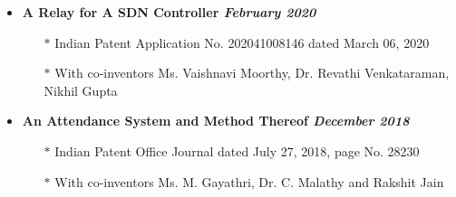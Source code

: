 \documentclass[10]{Resume}
\begin{document}
\begin{itemize}[noitemsep,nolistsep]
	\item\textbf{A Relay for A SDN Controller \hfill \textit{February 2020}}
		\begin{itemize}[leftmargin=*]
			\setlength\itemsep{-0.25em}
			\item[$\ast$]Indian Patent Application No. 202041008146 dated March 06, 2020
			\item[$\ast$]With co-inventors Ms. Vaishnavi Moorthy, Dr. Revathi Venkataraman, Nikhil Gupta
		\end{itemize}
	\item\textbf{An Attendance System and Method Thereof \hfill \textit{December 2018}}
		\begin{itemize}[leftmargin=*]
			\setlength\itemsep{-0.25em}
			\item[$\ast$]Indian Patent Office Journal dated July 27, 2018, page No. 28230
			\item[$\ast$]With co-inventors Ms. M. Gayathri, Dr. C. Malathy and Rakshit Jain
		\end{itemize}
\end{itemize}
\end{document}
